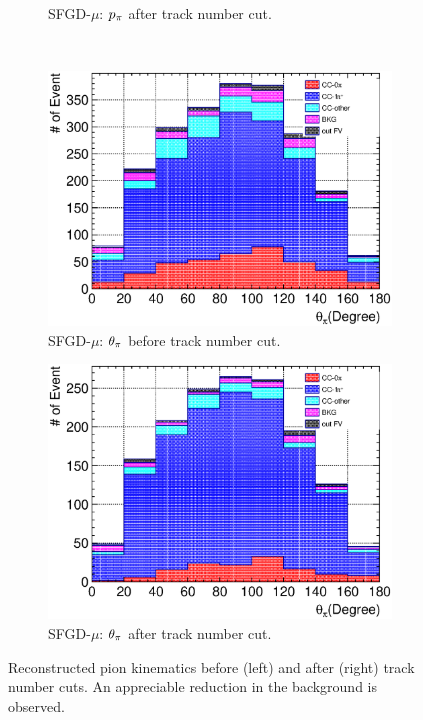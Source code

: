 \begin{figure}
\begin{subfigure}[!htb]{\dbfigwid\textwidth}
                  \caption{SFGD-$\mu$: $p_{\pi}$ after track number cut.}
                  \label{subfig:tlpi-ppi-af-trknumcut-sfg}
             \end{subfigure}
             \\
             \begin{subfigure}[!htb]{\dbfigwid\textwidth}
                  \includegraphics[width=\textwidth]{figures/sel/SFGmu_theta_pi_stack_al8.eps}
                  \caption{SFGD-$\mu$: $\theta_{\pi}$ before track number cut.}
                  \label{subfig:tlpi-tpi-bf-trknumcut-sfg}
             \end{subfigure}
             \begin{subfigure}[!htb]{\dbfigwid\textwidth}
                  \includegraphics[width=\textwidth]{figures/sel/SFGmu_theta_pi_stack_al9.eps}
                  \caption{SFGD-$\mu$: $\theta_{\pi}$ after track number cut.}
                  \label{subfig:tlpi-tpi-af-trknumcut-sfg}
             \end{subfigure}
             \caption{Reconstructed pion kinematics before (left) and after (right) track number cuts. An appreciable reduction in the background is observed.}
             \label{fig:tl-trknum-cut-res}
          \end{figure}

